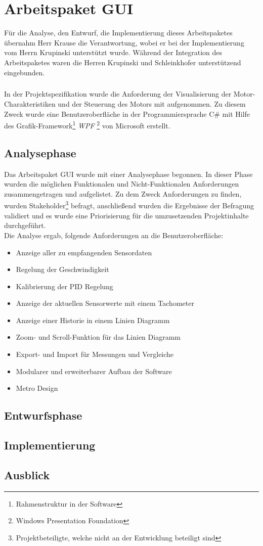 \graphicspath{{./gui/Bilder/}}

\chapter{Arbeitspaket GUI}
Für die Analyse, den Entwurf, die Implementierung dieses Arbeitspaketes übernahm Herr Krause die Verantwortung, wobei er bei der Implementierung vom Herrn Krupinski unterstützt wurde. Während der Integration des Arbeitspaketes waren die Herren Krupinski und Schleinkhofer unterstützend eingebunden.
\paragraph{}
In der Projektspezifikation wurde die Anforderung der Visualisierung der Motor-Charakteristiken und der Steuerung des Motors mit aufgenommen. Zu diesem Zweck wurde eine Benutzeroberfläche in der Programmiersprache C\# mit Hilfe des Grafik-Framework\footnote{Rahmenstruktur in der Software} \textit{WPF} \footnote{Windows Presentation Foundation} von Microsoft erstellt.

\section{Analysephase}
Das Arbeitspaket GUI wurde mit einer Analysephase begonnen. In dieser Phase wurden die möglichen Funktionalen und Nicht-Funktionalen Anforderungen zusammengetragen und aufgelistet. Zu dem Zweck Anforderungen zu finden, wurden Stakeholder\footnote{Projektbeteiligte, welche nicht an der Entwicklung beteiligt sind} befragt, anschließend wurden die Ergebnisse der Befragung validiert und es wurde eine Priorisierung für die umzusetzenden Projektinhalte durchgeführt.\\
Die Analyse ergab, folgende Anforderungen an die Benutzeroberfläche:

\begin{itemize}
	\item Anzeige aller zu empfangenden Sensordaten
	\item Regelung der Geschwindigkeit
	\item Kalibrierung der PID Regelung
	\item Anzeige der aktuellen Sensorwerte mit einem Tachometer
	\item Anzeige einer Historie in einem Linien Diagramm
	\item Zoom- und Scroll-Funktion für das Linien Diagramm
	\item Export- und Import für Messungen und Vergleiche
	\item Modularer und erweiterbarer Aufbau der Software
	\item Metro Design
\end{itemize} 

\section{Entwurfsphase}

\section{Implementierung}
 
\section{Ausblick}





